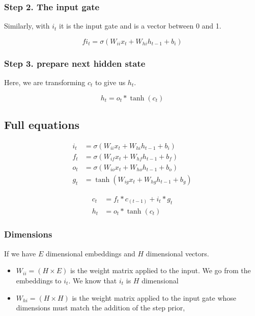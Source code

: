 \documentclass[11pt]{article}
\begin{document}
\subsubsection{Step 2. The input gate}

Similarly, with $i_t$ it is the input gate and is a vector between 0 and 1.

\begin{equation*}
    fi_t = \sigma (W_{ii}x_t + W_{hi}h_{t-1}+b_i)
\end{equation*}

\subsubsection{Step 3. prepare next hidden state}

Here, we are transforming $c_t$ to give us $h_t$. 

\begin{equation*}
    h_t = o_t \ast \tanh(c_t) 
\end{equation*}

\subsection{Full equations}

\begin{align*}
    i_t & = \sigma (W_{ii}x_t + W_{hi}h_{t-1}+b_i) \\
    f_t & = \sigma (W_{if}x_t + W_{hf}h_{t-1}+b_f) \\
    o_t & = \sigma (W_{io}x_t + W_{ho}h_{t-1}+b_o) \\
    g_t & = \tanh(W_{ig}x_t + W_{hg}h_{t-1}+b_g)
\end{align*}

\begin{align*}
    c_t & = f_t \ast c_{(t-1)} + i_t \ast g_t \\
    h_t & = o_t \ast \tanh(c_t)
\end{align*}

\subsubsection{Dimensions}

If we have $E$ dimensional embeddings and $H$ dimensional vectors.

\begin{itemize}
    \item $W_{ii}=(H\times E)$ is the weight matrix applied to the input. We go from the embeddings to $i_t$. We know that $i_t$ is $H$ dimensional 
    \item $W_{hi}=(H\times H)$ is the weight matrix applied to the input gate whose dimensions must match the addition of the step prior, 
\end{itemize}
\end{document}
